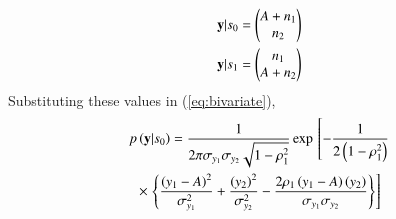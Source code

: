 \begin{enumerate}[label=\thesection.\arabic*.,ref=\thesection.\theenumi]
\begin{align}
\mathbf{y}|s_0 &= 
\begin{pmatrix}
A+n_1 \\
n_2
\end{pmatrix}\\
\mathbf{y}|s_1 &=  
\begin{pmatrix}
n_1 \\
A+n_2
\end{pmatrix}
\end{align}
Substituting these values in (\ref{eq:bivariate}),
\begin{multline}
\label{gauss_mutl_var1}
p\brak{\mbf{y}|s_0} = \frac{1}{2\pi\sigma_{y_1}\sigma_{y_2}\sqrt{1-\rho_1^2}}\exp\lsbrak{-\frac{1}{2\brak{1-\rho_1^2}}}
\\
\times \rsbrak{\cbrak{\frac{\brak{y_1-A}^2}{\sigma_{y_1}^2}+\frac{\brak{y_2}^2}{\sigma_{y_2}^2}-\frac{2\rho_1\brak{y_1-A}\brak{y_2}}{\sigma_{y_1}\sigma_{y_2}}}}

\end{multline}
\end{enumerate}
